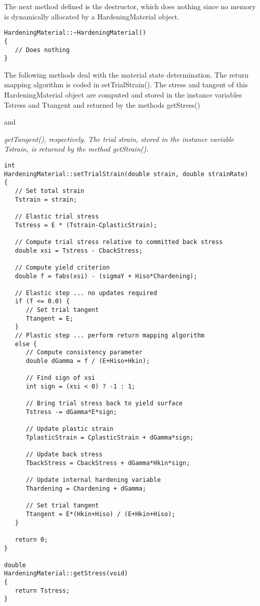\documentclass[12pt]{article}
\begin{document}
{\noindent The next method defined is the destructor, which does nothing since no memory
is dynamically allocated by a HardeningMaterial object.

{\sf\small
\begin{verbatim}
HardeningMaterial::~HardeningMaterial()
{
   // Does nothing
}
\end{verbatim}
}

\noindent The following methods deal with the material state determination. The return
mapping algorithm is coded in setTrialStrain(). The stress and tangent of this
HardeningMaterial object are computed and stored in the instance variables Tstress
and Ttangent and returned by the methods getStress()} and {\em getTangent(),
respectively. The trial strain, stored in the instance variable Tstrain, is returned
by the method getStrain().

{\sf\small
\begin{verbatim}
int 
HardeningMaterial::setTrialStrain(double strain, double strainRate)
{
   // Set total strain
   Tstrain = strain;
    
   // Elastic trial stress
   Tstress = E * (Tstrain-CplasticStrain);
    
   // Compute trial stress relative to committed back stress
   double xsi = Tstress - CbackStress;

   // Compute yield criterion
   double f = fabs(xsi) - (sigmaY + Hiso*Chardening);
    
   // Elastic step ... no updates required
   if (f <= 0.0) {
      // Set trial tangent
      Ttangent = E;
   }
   // Plastic step ... perform return mapping algorithm
   else {
      // Compute consistency parameter
      double dGamma = f / (E+Hiso+Hkin);
   
      // Find sign of xsi
      int sign = (xsi < 0) ? -1 : 1;

      // Bring trial stress back to yield surface
      Tstress -= dGamma*E*sign;
	
      // Update plastic strain
      TplasticStrain = CplasticStrain + dGamma*sign;
	
      // Update back stress
      TbackStress = CbackStress + dGamma*Hkin*sign;
	
      // Update internal hardening variable
      Thardening = Chardening + dGamma;
	
      // Set trial tangent
      Ttangent = E*(Hkin+Hiso) / (E+Hkin+Hiso);
   }

   return 0;
}

double 
HardeningMaterial::getStress(void)
{
   return Tstress;
}


\end{verbatim}}}
\end{document}
